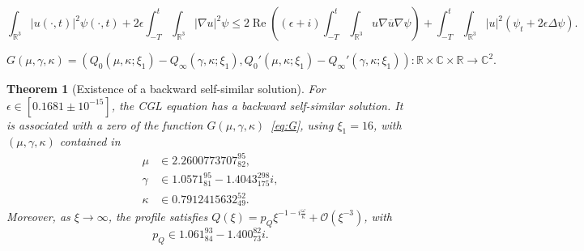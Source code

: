 \documentclass[10pt,a4paper]{amsart}
\newtheorem{theorem}{Theorem}
\newcommand{\codenumber}[1]{#1}
\newcommand{\conj}[1]{\overline{#1}}
\DeclareMathOperator{\real}{Re}
\newcommand{\resultnumber}[1]{#1}
\begin{document}
  \begin{equation}\label{eq:energy-inequality}
    \int_{\mathbb{R}^{3}} |u(\cdot, t)|^{2}\psi(\cdot, t)
    + 2\epsilon \int_{-T}^{t}\int_{\mathbb{R}^{3}} |\nabla u|^{2}\psi
    \leq 2\real\left((\epsilon + i)\int_{-T}^{t}\int_{\mathbb{R}^{3}} u\nabla \conj{u}\nabla\psi\right)
    + \int_{-T}^{t}\int_{\mathbb{R}^{3}} |u|^{2}(\psi_{t} + 2\epsilon \Delta\psi).
  \end{equation}

\begin{equation}\label{eq:G}
  G(\mu, \gamma, \kappa) = \left(
    Q_{0}(\mu, \kappa; \xi_{1}) - Q_{\infty}(\gamma, \kappa; \xi_{1}),
    Q_{0}'(\mu, \kappa; \xi_{1}) - Q_{\infty}'(\gamma, \kappa; \xi_{1})
  \right) \colon \mathbb{R} \times \mathbb{C} \times \mathbb{R} \to \mathbb{C}^{2}.
\end{equation}

\begin{theorem}[Existence of a backward self-similar solution]\label{thm:backward-existence}
  For \(\epsilon \in \codenumber{[0.1681 \pm 10^{-15}]}\), the CGL
  equation has a backward self-similar solution. It is associated with
  a zero of the function \(G(\mu, \gamma, \kappa)\)~\eqref{eq:G},
  using \(\xi_{1} = \codenumber{16}\), with \((\mu, \gamma, \kappa)\)
  contained in
  \begin{align*}
    \mu &\in \resultnumber{2.2600773707_{82}^{95}},\\
    \gamma &\in \resultnumber{1.0571_{81}^{95} - 1.4043_{175}^{298} i},\\
    \kappa &\in \resultnumber{0.7912415632_{49}^{52}}.
  \end{align*}
  Moreover, as \(\xi \to \infty\), the profile satisfies
  \(Q(\xi) = p_{Q}\xi^{-1 - i\frac{\omega}{\kappa}} +
  \mathcal{O}(\xi^{-3})\), with
  \begin{equation*}
    p_{Q} \in \resultnumber{1.061_{84}^{93} - 1.400_{73}^{82} i}.
  \end{equation*}
\end{theorem}
\end{document}
